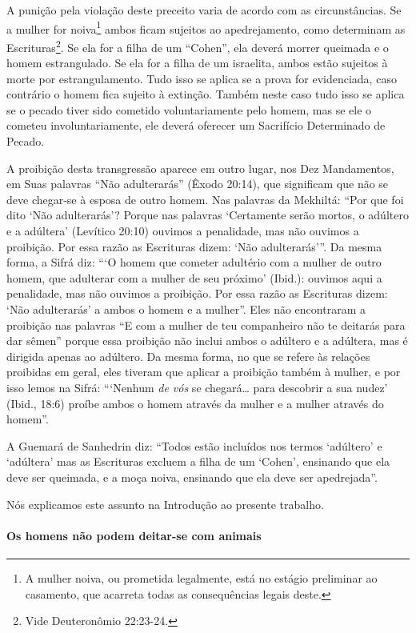 A punição pela violação deste preceito varia de acordo com as
circunstâncias. Se a mulher for noiva\footnote{A mulher noiva, ou prometida legalmente, está no estágio preliminar ao casamento, que acarreta todas as consequências legais deste.} ambos ficam
sujeitos ao apedrejamento, como determinam as
Escrituras\footnote{Vide Deuteronômio 22:23-24.}. Se ela for a filha de um ``Cohen'',
ela deverá morrer queimada e o homem estrangulado. Se ela for a filha de
um israelita, ambos estão sujeitos à morte por estrangulamento. Tudo
isso se aplica se a prova for evidenciada, caso contrário o homem fica
sujeito à extinção. Também neste caso tudo isso se aplica se o pecado
tiver sido cometido voluntariamente pelo homem, mas se ele o cometeu
involuntariamente, ele deverá oferecer um Sacrifício Determinado de
Pecado.

A proibição desta transgressão aparece em outro lugar, nos Dez
Mandamentos, em Suas palavras ``Não adulterarás'' (Êxodo 20:14), que
significam que não se deve chegar-se à esposa de outro homem. Nas
palavras da Mekhiltá: ``Por que foi dito `Não adulterarás'? Porque nas
palavras `Certamente serão mortos, o adúltero e a adúltera' (Levítico
20:10) ouvimos a penalidade, mas não ouvimos a proibição. Por essa razão
as Escrituras dizem: `Não adulterarás'''. Da mesma forma, a Sifrá diz:
```O homem que cometer adultério com a mulher de outro homem, que
adulterar com a mulher de seu próximo' (Ibid.): ouvimos aqui a
penalidade, mas não ouvimos a proibição. Por essa razão as Escrituras
dizem: `Não adulterarás' a ambos o homem e a mulher''. Eles não
encontraram a proibição nas palavras ``E com a mulher de teu
companheiro não te deitarás para dar sêmen'' porque essa proibição não
inclui ambos o adúltero e a adúltera, mas é dirigida apenas ao adúltero.
Da mesma forma, no que se refere às relações proibidas em geral, eles
tiveram que aplicar a proibição também à mulher, e por isso lemos na
Sifrá: ```Nenhum \emph{de vós} se chegará\ldots{} para descobrir a sua
nudez' (Ibid., 18:6) proíbe ambos o homem através da mulher e a mulher
através do homem''.

A Guemará de Sanhedrin diz: ``Todos estão incluídos nos termos
`adúltero' e `adúltera' mas as Escrituras excluem a filha de um `Cohen',
ensinando que ela deve ser queimada, e a moça noiva, ensinando que ela
deve ser apedrejada''.

Nós explicamos este assunto na Introdução ao presente trabalho.


\paragraph{Os homens não podem deitar-se com animais}

